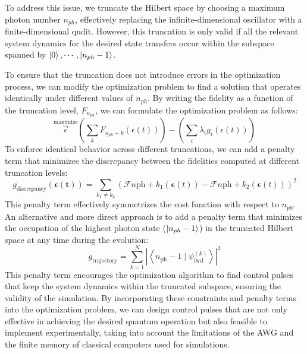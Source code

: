 \documentclass[12pt]{report}
\begin{document}
To address this issue, we truncate the Hilbert space by choosing a maximum photon number $n_{ph}$, effectively replacing the infinite-dimensional oscillator with a finite-dimensional qudit.
However, this truncation is only valid if all the relevant system dynamics for the desired state transfers occur within the subspace spanned by ${\ket{0}, \cdots, \ket{n_{ph} - 1}}$.
\par
To ensure that the truncation does not introduce errors in the optimization process, we can modify the optimization problem to find a solution that operates identically under different values of $n_{ph}$. 
By writing the fidelity as a function of the truncation level, $F_{n_{ph}}$, we can formulate the optimization problem as follows:
\begin{equation}
    \stackrel{\text{maximize}}{\vec{\epsilon}} \left( \sum_k F_{n_{ph}+k} (\epsilon(t)) \right) - \left( \sum_i \lambda_i g_i (\epsilon(t)) \right)
\end{equation}
To enforce identical behavior across different truncations, we can add a penalty term that minimizes the discrepancy between the fidelities computed at different truncation levels:
\begin{equation*}
    g_{\text{discrepancy}}(\boldsymbol{\epsilon}(\boldsymbol{t}))=\sum_{k_1 \neq k_2}\left(\mathcal{F}{n{\mathrm{ph}}+k_1}(\boldsymbol{\epsilon}(t))-\mathcal{F}{n{\mathrm{ph}}+k_2}(\boldsymbol{\epsilon}(t))\right)^2
\end{equation*}
This penalty term effectively symmetrizes the cost function with respect to $n_{ph}$.
An alternative and more direct approach is to add a penalty term that minimizes the occupation of the highest photon state ($\ket{n_{ph} - 1}$) in the truncated Hilbert space at any time during the evolution:
\begin{equation*}
    g_{\text{trajectory}}=\sum_{k=1}^N\left|\left\langle n_{\text{ph}}-1 \mid \psi_{\text{fwd}}^{(k)}\right\rangle\right|^2
\end{equation*}
This penalty term encourages the optimization algorithm to find control pulses that keep the system dynamics within the truncated subspace, ensuring the validity of the simulation.
By incorporating these constraints and penalty terms into the optimization problem, we can design control pulses that are not only effective in achieving the desired quantum operation but also feasible to implement experimentally, taking into account the limitations of the AWG and the finite memory of classical computers used for simulations.
\end{document}
